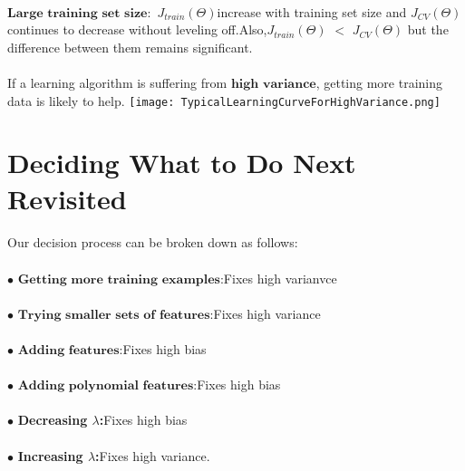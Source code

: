 \documentclass[UTF8]{ctexart}
\begin{document}
\paragraph{}
$\textbf{Large training set size}:$ $J_{train}(\Theta)$increase with training set size and $J_{CV}(\Theta)$continues to decrease without leveling off.Also,$J_{train}(\Theta)$ $<$ $J_{CV}(\Theta)$ but the difference between them remains significant.
\paragraph{}
If a learning algorithm is suffering from $\textbf{high variance}$, getting more training data is likely to help.
\texttt{[image: TypicalLearningCurveForHighVariance.png]}
\section{Deciding What to Do Next Revisited}
\paragraph{}
Our decision process can be broken down as follows:
\paragraph{}
$\bullet$ $\textbf{Getting more training examples:}$Fixes high varianvce
\paragraph{}
$\bullet$ $\textbf{Trying smaller sets of features:}$Fixes high variance
\paragraph{}
$\bullet$ $\textbf{Adding features:}$Fixes high bias
\paragraph{}
$\bullet$ $\textbf{Adding polynomial features:}$Fixes high bias
\paragraph{}
$\bullet$ \textbf{ Decreasing $\lambda$:}Fixes high bias
\paragraph{}
$\bullet$ \textbf{Increasing $\lambda$:}Fixes high variance.
\end{document}
